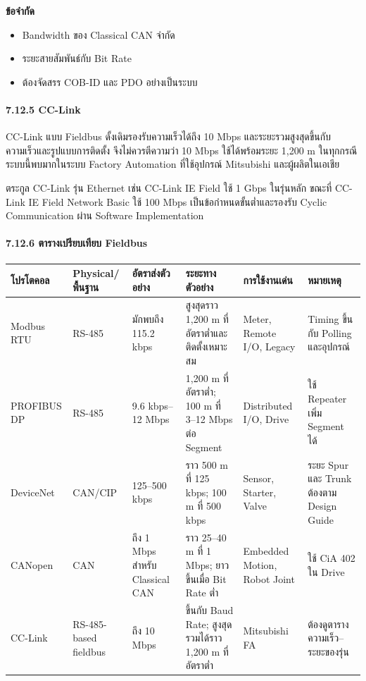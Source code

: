 \textbf{ข้อจำกัด}

\begin{itemize}
    \item Bandwidth ของ Classical CAN จำกัด
    \item ระยะสายสัมพันธ์กับ Bit Rate
    \item ต้องจัดสรร COB-ID และ PDO อย่างเป็นระบบ
\end{itemize}

\paragraph{7.12.5 CC-Link}

CC-Link แบบ Fieldbus ดั้งเดิมรองรับความเร็วได้ถึง 10 Mbps และระยะรวมสูงสุดขึ้นกับความเร็วและรูปแบบการติดตั้ง จึงไม่ควรตีความว่า 10 Mbps ใช้ได้พร้อมระยะ 1,200 m ในทุกกรณี ระบบนี้พบมากในระบบ Factory Automation ที่ใช้อุปกรณ์ Mitsubishi และผู้ผลิตในเอเชีย

ตระกูล CC-Link รุ่น Ethernet เช่น CC-Link IE Field ใช้ 1 Gbps ในรุ่นหลัก ขณะที่ CC-Link IE Field Network Basic ใช้ 100 Mbps เป็นข้อกำหนดขั้นต่ำและรองรับ Cyclic Communication ผ่าน Software Implementation

\paragraph{7.12.6 ตารางเปรียบเทียบ Fieldbus}

\begin{table}[htbp]
    \centering
    \small
    \begin{tabularx}{\textwidth}{@{}L{0.13\textwidth} L{0.14\textwidth} L{0.16\textwidth} L{0.18\textwidth} X X@{}}
        \hline
        \textbf{โปรโตคอล} & \textbf{Physical/พื้นฐาน} & \textbf{อัตราส่งตัวอย่าง} & \textbf{ระยะทางตัวอย่าง} & \textbf{การใช้งานเด่น} & \textbf{หมายเหตุ} \\
        \hline
        Modbus RTU & RS-485 & มักพบถึง 115.2 kbps & สูงสุดราว 1,200 m ที่อัตราต่ำและติดตั้งเหมาะสม & Meter, Remote I/O, Legacy & Timing ขึ้นกับ Polling และอุปกรณ์ \\
        PROFIBUS DP & RS-485 & 9.6 kbps–12 Mbps & 1,200 m ที่อัตราต่ำ; 100 m ที่ 3–12 Mbps ต่อ Segment & Distributed I/O, Drive & ใช้ Repeater เพิ่ม Segment ได้ \\
        DeviceNet & CAN/CIP & 125–500 kbps & ราว 500 m ที่ 125 kbps; 100 m ที่ 500 kbps & Sensor, Starter, Valve & ระยะ Spur และ Trunk ต้องตาม Design Guide \\
        CANopen & CAN & ถึง 1 Mbps สำหรับ Classical CAN & ราว 25–40 m ที่ 1 Mbps; ยาวขึ้นเมื่อ Bit Rate ต่ำ & Embedded Motion, Robot Joint & ใช้ CiA 402 ใน Drive \\
        CC-Link & RS-485-based fieldbus & ถึง 10 Mbps & ขึ้นกับ Baud Rate; สูงสุดรวมได้ราว 1,200 m ที่อัตราต่ำ & Mitsubishi FA & ต้องดูตารางความเร็ว–ระยะของรุ่น \\
        \hline
    \end{tabularx}
\end{table}

